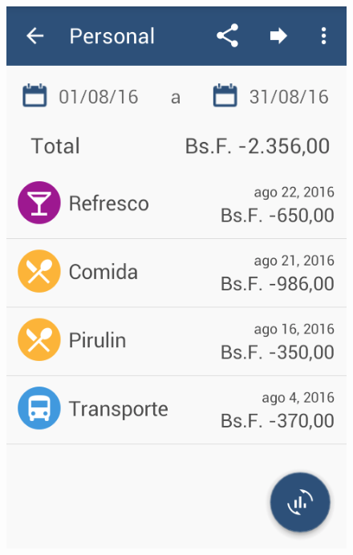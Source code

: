 \begin{figure}[ht]
\centering
\begin{minipage}{.5\textwidth}
  \centering
  \includegraphics[scale=0.4,type=png,ext=.png,read=.png]{imagenes/balance_report}
  \captionsetup{justification=centering}
  \label{fig:interfazBalanceReport}
\end{minipage}%
\begin{minipage}{.5\textwidth}
\centering

\end{minipage}
\end{figure}
